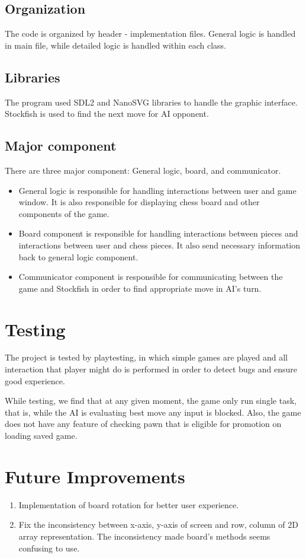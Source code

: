\documentclass[a4paper, 10pt, titlepage]{report}
\begin{document}
\section{Organization}
The code is organized by header - implementation files. General logic is handled in main file, while detailed logic is handled within each class.
\section{Libraries}
The program used SDL2 and NanoSVG libraries to handle the graphic interface. Stockfish is used to find the next move for AI opponent.
\section{Major component}
There are three major component: General logic, board, and communicator.
\begin{itemize}
  \item General logic is responsible for handling interactions between user and game window. It is also responsible for displaying chess board and other components of the game.
  \item Board component is responsible for handling interactions between pieces and interactions between user and chess pieces. It also send necessary information back to general logic component.
  \item Communicator component is responsible for communicating between the game and Stockfish in order to find appropriate move in AI's turn.
\end{itemize}
\chapter{Testing}

The project is tested by playtesting, in which simple games are played and all interaction that player might do is performed in order to detect bugs and ensure good experience.

While testing, we find that at any given moment, the game only run single task, that is, while the AI is evaluating best move any input is blocked. Also, the game does not have any feature of checking pawn that is eligible for promotion on loading saved game.

\chapter{Future Improvements}
\begin{enumerate}
  \item Implementation of board rotation for better user experience.
  \item Fix the inconsistency between x-axis, y-axis of screen and row, column of 2D array representation. The inconsistency made board's methods seems confusing to use.
\end{enumerate}
\end{document}
